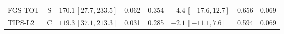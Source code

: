 \documentclass[10pt,a4paper]{article}
\begin{document}
\begin{longtable}{lcp{37mm}rrp{37mm}rr}
FGS-TOT & S & \(170.1\,[27.7,233.5]\) & 0.062 & 0.354 & \(-4.4\,[-17.6,12.7]\) & 0.656 & 0.069\\
TIPS-L2 & C & \(119.3\,[37.1,213.3]\) & 0.031 & 0.285 & \(-2.1\,[-11.1,7.6]\) & 0.594 & 0.069\\

\end{longtable}
\end{document}
